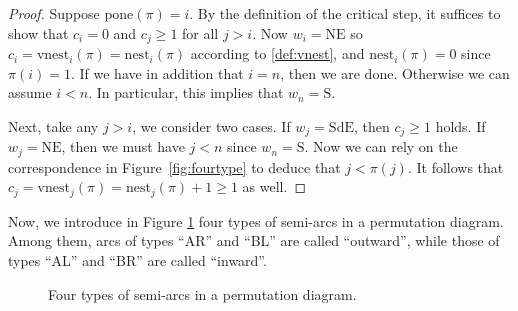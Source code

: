 \documentclass[12pt]{amsart}
\numberwithin{equation}{section}
\theoremstyle{plain}
\theoremstyle{definition}
\def\S{\mathrm{S}}
\def\NE{\mathrm{NE}}
\def\SdE{\mathrm{SdE}}
\def\pone{\mathrm{pone}}
\def\vnest{\mathrm{vnest}}
\def\nest{\mathrm{nest}}
\begin{document}
\begin{proof}
Suppose $\pone(\pi)=i$. By the definition of the critical step, it suffices to show that $c_i=0$ and $c_j\ge 1$ for all $j>i$. Now $w_i=\NE$ so $c_i=\vnest_i(\pi)=\nest_i(\pi)$ according to \eqref{def:vnest}, and $\nest_i(\pi)=0$ since $\pi(i)=1$. If we have in addition that $i=n$, then we are done. Otherwise we can assume $i<n$. In particular, this implies that $w_n=\S$.

Next, take any $j>i$, we consider two cases. If $w_j=\SdE$, then $c_j\ge 1$ holds. If $w_j=\NE$, then we must have $j<n$ since $w_n=\S$. Now we can rely on the correspondence in Figure~\ref{fig:fourtype} to deduce that $j < \pi(j)$. It follows that $c_j=\vnest_j(\pi)=\nest_j(\pi)+1 \ge 1$ as well.
\end{proof}

Now, we introduce in Figure \ref{fig:fourtype2} four types of semi-arcs in a permutation diagram. Among them, arcs of types ``AR'' and ``BL'' are called ``outward'', while those of types ``AL'' and ``BR'' are called ``inward''.

\begin{figure}[!htbp]
\begin{center}

\caption{Four types of semi-arcs in a permutation diagram.}
\label{fig:fourtype2}
\end{center}
\end{figure}
\end{document}
